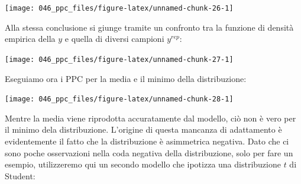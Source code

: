 \documentclass[
  10pt,
  italian,
  a4paper,
  extrafontsizes,onecolumn,openright
  ]{memoir}
\newenvironment{Shaded}{\begin{snugshade}}{\end{snugshade}}
\newcommand{\AttributeTok}[1]{\textcolor[rgb]{0.77,0.63,0.00}{#1}}
\newcommand{\DecValTok}[1]{\textcolor[rgb]{0.00,0.00,0.81}{#1}}
\newcommand{\FunctionTok}[1]{\textcolor[rgb]{0.00,0.00,0.00}{#1}}
\newcommand{\NormalTok}[1]{#1}
\newcommand{\SpecialCharTok}[1]{\textcolor[rgb]{0.00,0.00,0.00}{#1}}
\newcommand{\StringTok}[1]{\textcolor[rgb]{0.31,0.60,0.02}{#1}}
\begin{document}
\begin{center}\texttt{[image: 046\_ppc\_files/figure-latex/unnamed-chunk-26-1]} \end{center}

\noindent
Alla stessa conclusione si giunge tramite un confronto tra la funzione di densità empirica della \(y\) e quella di diversi campioni \(y^{rep}\):

\begin{Shaded}
\end{Shaded}

\begin{center}\texttt{[image: 046\_ppc\_files/figure-latex/unnamed-chunk-27-1]} \end{center}

\noindent
Eseguiamo ora i PPC per la media e il minimo della distribuzione:

\begin{Shaded}
\end{Shaded}

\begin{center}\texttt{[image: 046\_ppc\_files/figure-latex/unnamed-chunk-28-1]} \end{center}

\noindent
Mentre la media viene riprodotta accuratamente dal modello, ciò non è vero per il minimo dela distribuzione. L'origine di questa mancanza di adattamento è evidentemente il fatto che la distribuzione è asimmetrica negativa. Dato che ci sono poche osservazioni nella coda negativa della distribuzione, solo per fare un esempio, utilizzeremo qui un secondo modello che ipotizza una distribuzione \(t\) di Student:
\end{document}
